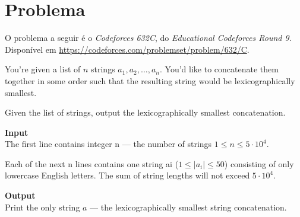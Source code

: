 \documentclass{article}
\begin{document}
\section{Problema}
O problema a seguir é o \emph{Codeforces 632C}, do \emph{Educational Codeforces Round 9}. Disponível em \url{https://codeforces.com/problemset/problem/632/C}.


\begin{problem}
    You're given a list of \(n\) strings \(a_1, a_2, \dotsc, a_n\). You'd like to concatenate them together in some order such that the resulting string would be lexicographically smallest.

    Given the list of strings, output the lexicographically smallest concatenation.
    
    \textbf{Input} \\
    The first line contains integer n — the number of strings \(1 \leq n \leq 5 \cdot 10^4\).
    
    Each of the next n lines contains one string ai (\(1 \leq |a_i| \leq 50\)) consisting of only lowercase English letters. The sum of string lengths will not exceed \(5 \cdot 10^4\).
    
    \textbf{Output} \\
    Print the only string \(a\) — the lexicographically smallest string concatenation.
\end{problem}
\end{document}
